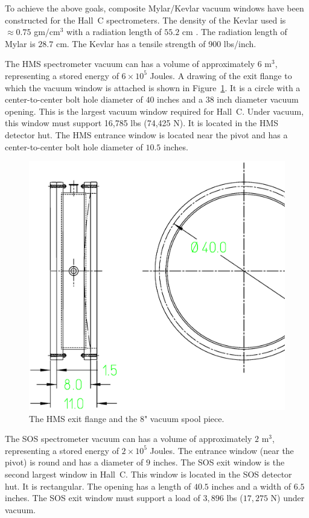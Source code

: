 To achieve the above goals,
composite Mylar/Kevlar vacuum windows have been constructed for the
Hall~C spectrometers. The density of the Kevlar used
is $\approx 0.75$ gm/cm$^3$ with a radiation
length of $55.2$ cm \cite{rdup1}. The radiation length
of Mylar is $28.7$ cm. The Kevlar has a tensile strength of 900 lbs/inch.

The HMS spectrometer vacuum can has a volume
of approximately $6$ m$^3$, representing a stored energy of $6 \times 10^5$
Joules. A drawing of the exit flange to which the vacuum
window is attached is shown in Figure~\ref{fig:hms_flange}.  It is a
circle with a center-to-center bolt hole diameter of $40$ inches
and a $38$ inch diameter vacuum opening. This is the largest vacuum window
required for Hall~C.
Under vacuum, this window must support 16,785
lbs (74,425 N). It is located in the HMS detector hut. The HMS
entrance window is located near the pivot and has a center-to-center
bolt hole diameter of $10.5$ inches.

\begin{figure}
\includegraphics[width=6in]{spectrometers/figHMSflange.eps}
\caption{The HMS exit flange and the 8" vacuum spool piece. \label{fig:hms_flange}}
\end{figure}

The SOS spectrometer vacuum can has a volume of approximately $2$ m$^3$,
representing a stored energy of $2 \times 10^5$ Joules. The entrance
window (near the pivot) is round and has a diameter of $9$ inches.
The SOS exit window is the second largest window in Hall~C. This
window is located in the SOS detector hut. It is rectangular.
The opening has a length of $40.5$ inches and a width of $6.5$ inches.
The SOS exit
window must support a load of $3,896$ lbs ($17,275$ N) under vacuum.

